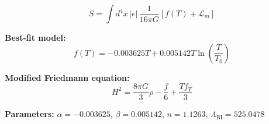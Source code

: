 
\begin{equation}
  S = \int d^4x \, |e| \, \frac{1}{16\pi G} \left[ f(T) + \mathcal{L}_m \right]
\end{equation}

\textbf{Best-fit model:}
\begin{equation}
  f(T) = -0.003625 T + 0.005142 T \ln\!\left(\frac{T}{T_0}\right)
\end{equation}

\textbf{Modified Friedmann equation:}
\begin{equation}
  H^2 = \frac{8\pi G}{3} \rho - \frac{f}{6} + \frac{T f_T}{3}
\end{equation}

\textbf{Parameters:}
$\alpha = -0.003625$, \quad
$\beta = 0.005142$, \quad
$n = 1.1263$, \quad
$\Lambda_{\text{BI}} = 525.0478$